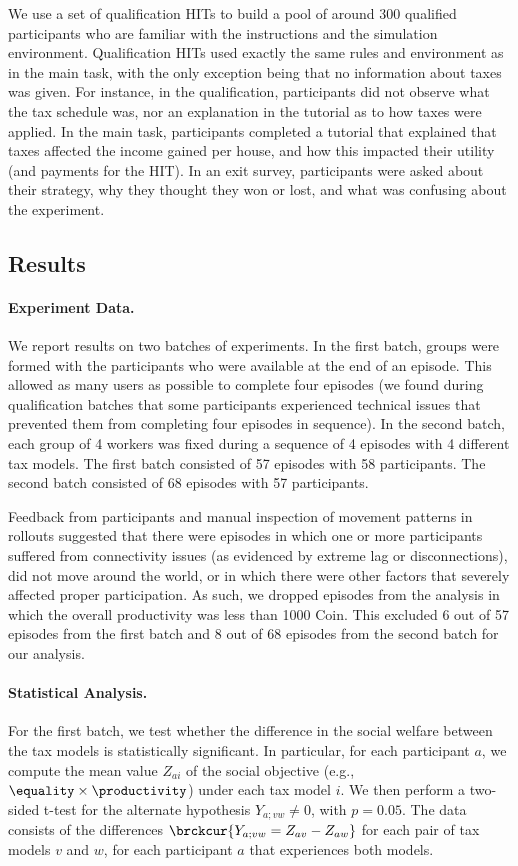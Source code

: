 We use a set of qualification HITs to build a pool of around 300 qualified participants who are familiar with the instructions and the simulation environment.
Qualification HITs used exactly the same rules and environment as in the main task, with the only exception being that no information about taxes was given. For instance, in the qualification, participants did not observe what the tax schedule was, nor an explanation in the tutorial as to how taxes were applied.
In the main task, participants completed a tutorial that explained that taxes affected the income gained per house, and how this impacted their utility (and payments for the HIT).
In an exit survey, participants were asked about their strategy, why they thought they won or lost, and what was confusing about the experiment.
\subsection{Results}
\paragraph{Experiment Data.}
We report results on two batches of experiments.
In the first batch, groups were formed with the participants who were available at the end of an episode. This allowed as many users as possible to complete four episodes (we found during qualification batches that some participants experienced technical issues that prevented them from completing four episodes in sequence).
In the second batch, each group of 4 workers was fixed during a sequence of 4 episodes with 4 different tax models.
The first batch consisted of 57 episodes with 58 participants.
The second batch consisted of 68 episodes with 57 participants.

Feedback from participants and manual inspection of movement patterns in rollouts suggested that there were episodes in which one or more participants suffered from connectivity issues (as evidenced by extreme lag or disconnections), did not move around the world, or in which there were other factors that severely affected proper participation.
As such, we dropped  episodes from the analysis in which the overall productivity was less than 1000 Coin. This excluded 6 out of 57 episodes from the first batch and 8 out of 68 episodes from the second batch for our analysis.
\paragraph{Statistical Analysis.}
For the first batch, we test whether the difference in the social welfare  between the tax models is statistically significant. In particular, for each participant $a$,
we compute the mean value $Z_{ai}$ of the social objective (e.g., $\equality\times\productivity$) under each tax model $i$.
We then perform a two-sided t-test for the alternate hypothesis $Y_{a;vw}\neq 0$, with $p = 0.05$. The data consists of the differences $\brckcur{Y_{a;vw} = Z_{av} - Z_{aw}}$ for each pair of tax models $v$ and $w$, for each participant $a$ that experiences both models.

